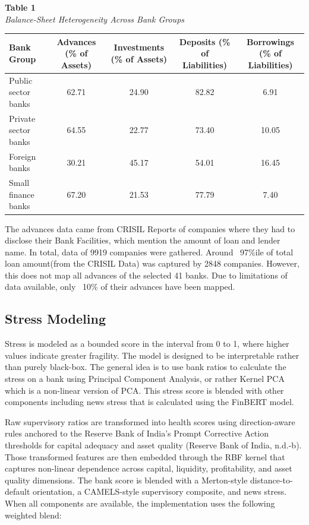 \documentclass[12pt]{article}
\begin{document}
\begin{table}[h]
\centering
\begin{minipage}{\textwidth}
\textbf{Table 1}\\
\textit{Balance-Sheet Heterogeneity Across Bank Groups}
\end{minipage}
\vspace{0.1in}

\begin{tabular}{p{1.7in}cccc}
\hline
Bank Group & Advances (\% of Assets) & Investments (\% of Assets) & Deposits (\% of Liabilities) & Borrowings (\% of Liabilities) \\
\hline
Public sector banks & 62.71 & 24.90 & 82.82 & 6.91 \\
Private sector banks & 64.55 & 22.77 & 73.40 & 10.05 \\
Foreign banks & 30.21 & 45.17 & 54.01 & 16.45 \\
Small finance banks & 67.20 & 21.53 & 77.79 & 7.40 \\
\hline
\end{tabular}
\end{table}

The advances data came from CRISIL Reports of companies where they had to disclose their Bank Facilities, which mention the amount of loan and lender name. In total, data of 9919 companies were gathered. Around ~97\%ile of total loan amount(from the CRISIL Data) was captured by 2848 companies. However, this does not map all advances of the selected 41 banks. Due to limitations of data available, only ~10\% of their advances have been mapped.

\subsection*{Stress Modeling}

Stress is modeled as a bounded score in the interval from 0 to 1, where higher values indicate greater fragility. The model is designed to be interpretable rather than purely black-box. The general idea is to use bank ratios to calculate the stress on a bank using Principal Component Analysis, or rather Kernel PCA which is a non-linear version of PCA. This stress score is blended with other components including news stress that is calculated using the FinBERT model. 

Raw supervisory ratios are transformed into health scores using direction-aware rules anchored to the Reserve Bank of India's Prompt Corrective Action thresholds for capital adequacy and asset quality (Reserve Bank of India, n.d.-b). Those transformed features are then embedded through the RBF kernel that captures non-linear dependence across capital, liquidity, profitability, and asset quality dimensions. The bank score is blended with a Merton-style distance-to-default orientation, a CAMELS-style supervisory composite, and news stress. When all components are available, the implementation uses the following weighted blend:
\end{document}
